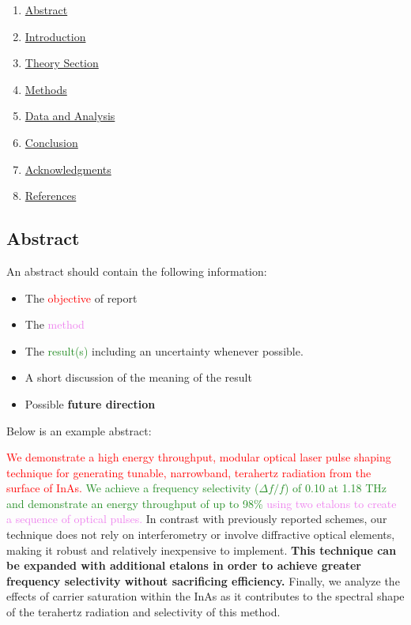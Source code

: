 \documentclass[12pt]{article}
\begin{document}
\begin{enumerate}
\item \hyperref[sec:Abstract]{Abstract}
\item \hyperref[sec:Introduction]{Introduction}
\item \hyperref[sec:Theory]{Theory Section}
\item \hyperref[sec:Methods]{Methods}
\item \hyperref[sec:Data]{Data and Analysis}
\item \hyperref[sec:Conclusion]{Conclusion}
\item \hyperref[sec:Acknowledgments]{Acknowledgments}
\item \hyperref[sec:References]{References}
\end{enumerate}

\newpage

\subsection{Abstract}
\label{sec:Abstract}

 An abstract should contain the following information:

 \begin{itemize}
  \item The \textcolor{red}{objective} of report
  \item The \textcolor{violet}{method}
  \item The \textcolor{ForestGreen}{result(s)} including an uncertainty whenever possible.
  \item A short \textcolor{BurntOrange}{discussion} of the meaning of the result
  \item Possible {\bf future direction}
 \end{itemize}

 Below is an example abstract:

 \begin{em}
  \textcolor{red}{We demonstrate a high energy throughput, modular optical
  laser pulse shaping technique for generating tunable, narrowband, terahertz
  radiation from the surface of InAs.} \textcolor{ForestGreen}{We achieve a
  frequency selectivity ($\Delta f / f$) of 0.10 at 1.18 THz and demonstrate
  an energy throughput of up to 98\%} \textcolor{violet}{using two etalons to
  create a sequence of optical pulses.} \textcolor{BurntOrange}{In contrast
  with previously reported schemes, our technique does not rely on
  interferometry or involve diffractive optical elements, making it robust and
  relatively inexpensive to implement.} \textbf{This technique can be expanded
  with additional etalons in order to achieve greater frequency selectivity
  without sacrificing efficiency.} \textcolor{BurntOrange}{Finally, we analyze
  the effects of carrier saturation within the InAs as it contributes to the
  spectral shape of the terahertz radiation and selectivity of this method. }
 \end{em}
\end{document}
